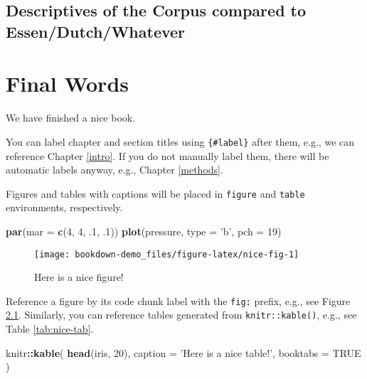 \documentclass[]{book}
\newenvironment{Shaded}{\begin{snugshade}}{\end{snugshade}}
\newcommand{\DataTypeTok}[1]{\textcolor[rgb]{0.13,0.29,0.53}{#1}}
\newcommand{\DecValTok}[1]{\textcolor[rgb]{0.00,0.00,0.81}{#1}}
\newcommand{\FloatTok}[1]{\textcolor[rgb]{0.00,0.00,0.81}{#1}}
\newcommand{\KeywordTok}[1]{\textcolor[rgb]{0.13,0.29,0.53}{\textbf{#1}}}
\newcommand{\NormalTok}[1]{#1}
\newcommand{\OperatorTok}[1]{\textcolor[rgb]{0.81,0.36,0.00}{\textbf{#1}}}
\newcommand{\OtherTok}[1]{\textcolor[rgb]{0.56,0.35,0.01}{#1}}
\newcommand{\StringTok}[1]{\textcolor[rgb]{0.31,0.60,0.02}{#1}}
\theoremstyle{definition}
\theoremstyle{definition}
\theoremstyle{definition}
\theoremstyle{remark}
\begin{document}
\hypertarget{descriptives-of-the-corpus-compared-to-essendutchwhatever}{%
\section{Descriptives of the Corpus compared to
Essen/Dutch/Whatever}\label{descriptives-of-the-corpus-compared-to-essendutchwhatever}}

\hypertarget{final-words}{%
\chapter{Final Words}\label{final-words}}

We have finished a nice book.

You can label chapter and section titles using \texttt{\{\#label\}}
after them, e.g., we can reference Chapter \ref{intro}. If you do not
manually label them, there will be automatic labels anyway, e.g.,
Chapter \ref{methods}.

Figures and tables with captions will be placed in \texttt{figure} and
\texttt{table} environments, respectively.

\begin{Shaded}
\begin{Highlighting}[]
\KeywordTok{par}\NormalTok{(}\DataTypeTok{mar =} \KeywordTok{c}\NormalTok{(}\DecValTok{4}\NormalTok{, }\DecValTok{4}\NormalTok{, }\FloatTok{.1}\NormalTok{, }\FloatTok{.1}\NormalTok{))}
\KeywordTok{plot}\NormalTok{(pressure, }\DataTypeTok{type =} \StringTok{'b'}\NormalTok{, }\DataTypeTok{pch =} \DecValTok{19}\NormalTok{)}
\end{Highlighting}
\end{Shaded}

\begin{figure}

{\centering \texttt{[image: bookdown-demo\_files/figure-latex/nice-fig-1]} 

}

\caption{Here is a nice figure!}\label{fig:nice-fig}
\end{figure}

Reference a figure by its code chunk label with the \texttt{fig:}
prefix, e.g., see Figure \ref{fig:nice-fig}. Similarly, you can
reference tables generated from \texttt{knitr::kable()}, e.g., see Table
\ref{tab:nice-tab}.

\begin{Shaded}
\begin{Highlighting}[]
\NormalTok{knitr}\OperatorTok{::}\KeywordTok{kable}\NormalTok{(}
  \KeywordTok{head}\NormalTok{(iris, }\DecValTok{20}\NormalTok{), }\DataTypeTok{caption =} \StringTok{'Here is a nice table!'}\NormalTok{,}
  \DataTypeTok{booktabs =} \OtherTok{TRUE}
\NormalTok{)}
\end{Highlighting}
\end{Shaded}
\end{document}
